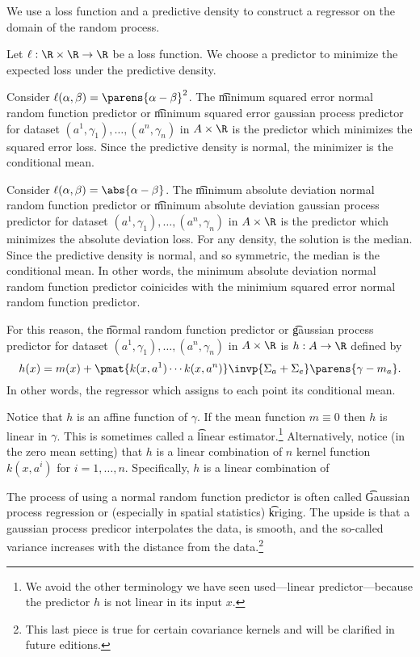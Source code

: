 

We use a loss function and a predictive density to construct a regressor on the domain of the random process.


Let $\ell: \R \times \R \to \R$ be a loss function.
We choose a predictor to minimize the expected loss under the predictive density.

Consider $\ell(\alpha, \beta) = \parens{\alpha - \beta}^2$.
The \t{minimum squared error normal random function predictor} or \t{minimum squared error gaussian process predictor} for dataset $(a^1, \gamma_1), \dots, (a^n, \gamma_n)$ in $A \times \R$ is the predictor which minimizes the squared error loss.
Since the predictive density is normal, the minimizer is the conditional mean.

Consider $\ell(\alpha, \beta) = \abs{\alpha - \beta}$.
The \t{minimum absolute deviation normal random function predictor} or \t{minimum absolute deviation gaussian process predictor} for dataset $(a^1, \gamma_1), \dots, (a^n, \gamma_n)$ in $A \times \R$ is the predictor which minimizes the absolute deviation loss.
For any density, the solution is the median.
Since the predictive density is normal, and so symmetric, the median is the conditional mean.
In other words, the minimum absolute deviation normal random function predictor coinicides with the minimium squared error normal random function predictor.


For this reason, the \t{normal random function predictor} or \t{gaussian process predictor} for dataset $(a^1, \gamma_1), \dots, (a^n, \gamma_n)$ in $A \times \R$ is $h: A \to \R$ defined by
\[
  h(x) = m(x) + \pmat{k(x,a^1) \cdots k(x, a^n)}\invp{\Sigma_{a} + \Sigma_{e}}\parens{\gamma - m_{a}}.
\]
In other words, the regressor which assigns to each point its conditional mean.

Notice that $h$ is an affine function of $\gamma$.
If the mean function $m \equiv 0$ then $h$ is linear in $\gamma$.
This is sometimes called a \t{linear estimator}.\footnote{We avoid the other terminology we have seen used---linear predictor---because the predictor $h$ is not linear in its input $x$.}
Alternatively, notice (in the zero mean setting) that $h$ is a linear combination of $n$ kernel function $k(x, a^i)$ for $i = 1, \dots, n$.
Specifically, $h$ is a linear combination of

The process of using a normal random function predictor is often called \t{Gaussian process regression} or (especially in spatial statistics) \t{kriging}.
The upside is that a gaussian process predicor interpolates the data, is smooth, and the so-called variance increases with the distance from the data.\footnote{This last piece is true for certain covariance kernels and will be clarified in future editions.}
